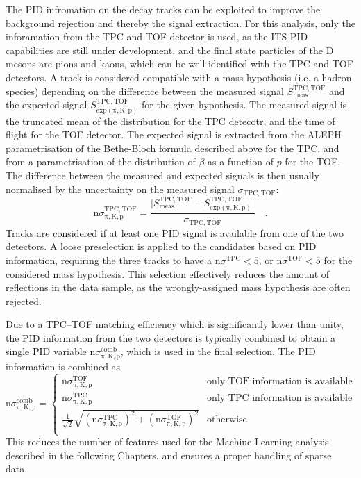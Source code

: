 The PID infromation on the decay tracks can be exploited to improve the background rejection and thereby the signal extraction. For this analysis, only the inforamation from the TPC and TOF detector is used, as the ITS PID capabilities are still under development, and the final state particles of the D mesons are pions and kaons, which can be well identified with the TPC and TOF detectors. A track is considered compatible with a mass hypothesis (i.e. a hadron species) depending on the difference between the measured signal $S_\mathrm{meas}^\mathrm{TPC,TOF}$ and the expected signal $S_\mathrm{exp (\pi, K, p)}^\mathrm{TPC,TOF}$ for the given hypothesis. The measured signal is the truncated mean of the \dedx distribution for the TPC detecotr, and the time of flight for the TOF detector. The expected signal is extracted from the ALEPH parametrisation of the Bethe-Bloch formula described above for the TPC, and from a parametrisation of the distribution of $\beta$ as a function of $p$ for the TOF. The difference between the measured and expected signals is then usually normalised by the uncertainty on the measured signal $\sigma_\mathrm{TPC, TOF}$:
\begin{equation*}
    \mathrm{n}\sigma_\mathrm{\pi, K, p}^\mathrm{TPC, TOF} = \frac{\lvert S_\mathrm{meas}^\mathrm{TPC, TOF} - S_\mathrm{exp (\pi, K, p)}^\mathrm{TPC, TOF}\rvert}{\sigma_\mathrm{TPC, TOF}}\quad .
\end{equation*}
Tracks are considered if at least one PID signal is available from one of the two detectors. A loose preselection is applied to the candidates based on PID information, requiring the three tracks to have a $\mathrm{n}\sigma^\mathrm{TPC} < 5$, or $\mathrm{n}\sigma^\mathrm{TOF} < 5$ for the considered mass hypothesis. This selection effectively reduces the amount of reflections in the data sample, as the wrongly-assigned mass hypothesis are often rejected.

Due to a TPC--TOF matching efficiency which is significantly lower than unity, the PID information from the two detectors is typically combined to obtain a single PID variable $\mathrm{n}\sigma^\mathrm{comb}_\mathrm{\pi, K, p}$, which is used in the final selection. The PID information is combined as
\begin{equation*}
    \mathrm{n}\sigma^\mathrm{comb}_\mathrm{\pi, K, p} = 
    \begin{cases}
        \mathrm{n}\sigma^\mathrm{TOF}_\mathrm{\pi, K, p} & \text{only TOF information is available}\\
        \mathrm{n}\sigma^\mathrm{TPC}_\mathrm{\pi, K, p} & \text{only TPC information is available}\\
        \frac{1}{\sqrt{2}}\sqrt{(\mathrm{n}\sigma^\mathrm{TPC}_\mathrm{\pi, K, p})^2 + (\mathrm{n}\sigma^\mathrm{TOF}_\mathrm{\pi, K, p})^2} & \text{otherwise}\\
    \end{cases}
\end{equation*}
This reduces the number of features used for the Machine Learning analysis described in the following Chapters, and ensures a proper handling of sparse data.


